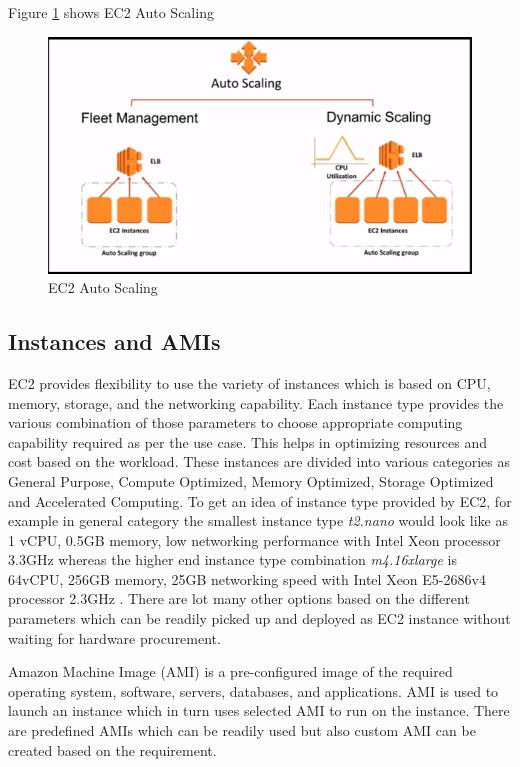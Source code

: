 Figure \ref{f:ec2-auto-scaling} shows EC2 Auto Scaling
\begin{figure}[!ht]
  \centering\includegraphics[width=\columnwidth]{images/ec2AutoScaling.PNG}
  \caption{EC2 Auto Scaling \cite{www-aws-ec2autoscaling}}\label{f:ec2-auto-scaling}
\end{figure}

\subsection{Instances and AMIs}
EC2 provides flexibility to use the variety of instances which is based on CPU, memory, storage, and the networking capability. Each instance type provides the various combination of those parameters to choose appropriate computing capability required as per the use case. This helps in optimizing resources and cost based on the workload. These instances are divided into various categories as General Purpose, Compute Optimized, Memory Optimized, Storage Optimized and Accelerated Computing. To get an idea of instance type provided by EC2, for example in general category the smallest instance type \emph{t2.nano} would look like as 1 vCPU, 0.5GB memory, low networking performance with Intel Xeon processor 3.3GHz whereas the higher end instance type combination \emph{m4.16xlarge} is 64vCPU, 256GB memory, 25GB networking speed with Intel Xeon E5-2686v4 processor 2.3GHz \cite{www-aws-ec2instance}. There are lot many other options based on the different parameters which can be readily picked up and deployed as EC2 instance without waiting for hardware procurement.

Amazon Machine Image (AMI) \cite{www-aws-ec2instance} is a pre-configured image of the required operating system, software, servers, databases, and applications. AMI is used to launch an instance which in turn uses selected AMI to run on the instance. There are predefined AMIs which can be readily used but also custom AMI can be created based on the requirement.

